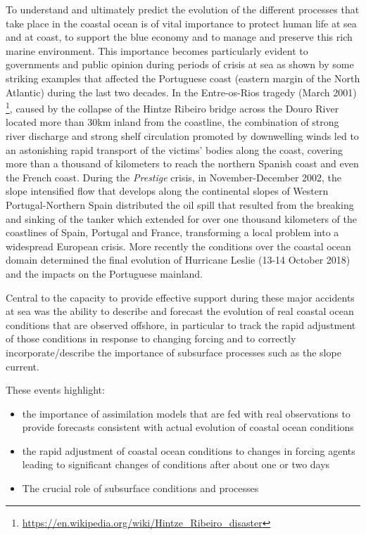 To understand and ultimately predict the evolution of the different
processes that take place in the coastal ocean is of vital importance
to protect human life at sea and at coast, to support the blue economy
and to manage and preserve this rich marine environment. This
importance becomes particularly evident to governments and public
opinion during periods of crisis at sea as shown by some striking
examples that affected the Portuguese coast (eastern margin of the
North Atlantic) during the last two decades. In the Entre-os-Rios
tragedy (March 2001)
\footnote{\url{https://en.wikipedia.org/wiki/Hintze_Ribeiro_disaster}},
caused by the collapse of the Hintze Ribeiro bridge across the Douro
River located more than 30km inland from the coastline, the
combination of strong river discharge and strong shelf circulation
promoted by downwelling winds led to an astonishing rapid transport of
the victims' bodies along the coast, covering more than a thousand of
kilometers to reach the northern Spanish coast and even the French
coast. During the \emph{Prestige} crisis, in November-December 2002,
the slope intensified flow that develops along the continental slopes
of Western Portugal-Northern Spain distributed the oil spill that
resulted from the breaking and sinking of the tanker which extended
for over one thousand kilometers of the coastlines of Spain, Portugal
and France, transforming a local problem into a widespread European
crisis. More recently the conditions over the coastal ocean domain
determined the final evolution of Hurricane Leslie (13-14 October
2018) and the impacts on the Portuguese mainland.
 
Central to the capacity to provide effective support during these
major accidents at sea was the ability to describe and forecast the
evolution of real coastal ocean conditions that are observed offshore,
in particular to track the rapid adjustment of those conditions in
response to changing forcing and to correctly incorporate/describe the
importance of subsurface processes such as the slope current.
 
These events highlight:

\begin{itemize}[noitemsep,topsep=0pt,parsep=0pt,partopsep=0pt]
  
\item the importance of assimilation models that are fed with real
  observations to provide forecasts consistent with actual evolution
  of coastal ocean conditions

\item the rapid adjustment of coastal ocean conditions to changes in
  forcing agents leading to significant changes of conditions after
  about one or two days

\item The crucial role of subsurface conditions and processes
 
\end{itemize}

